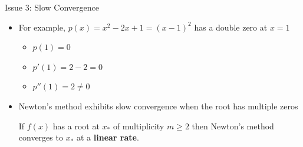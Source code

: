 \documentclass[10pt]{beamer}
\begin{document}
\begin{frame}{Issue 3: Slow Convergence}

{}

\begin{itemize}
    \item For example, \( p(x) = x^2 - 2x + 1 = (x-1)^2 \) has a double zero at \( x = 1 \)
    \begin{itemize}
        \item $p(1) = 0$
        \item $p'(1)=2-2 = 0$
        \item $p''(1)= 2 \ne 0$
    \end{itemize}
    \item Newton's method exhibits slow convergence when the root has multiple zeros

{\begin{theorem}
    If $f(x)$ has a root at $x_*$ of multiplicity $m\ge 2$ then Newton's method converges to $x_*$ at a \textbf{linear rate}. 
\end{theorem}}
\end{itemize}
\end{frame}


\end{document}
